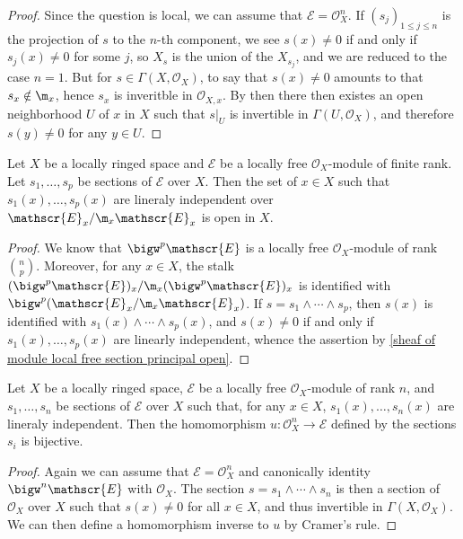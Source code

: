 \begin{proof}
Since the question is local, we can assume that $\mathscr{E}=\mathscr{O}_X^n$. If $(s_j)_{1\leq j\leq n}$ is the projection of $s$ to the $n$-th component, we see $s(x)\neq 0$ if and only if $s_j(x)\neq 0$ for some $j$, so $X_s$ is the union of the $X_{s_j}$, and we are reduced to the case $n=1$. But for $s\in\Gamma(X,\mathscr{O}_X)$, to say that $s(x)\neq 0$ amounts to that $s_x\notin\m_x$, hence $s_x$ is inveritble in $\mathscr{O}_{X,x}$. By then there then existes an open neighborhood $U$ of $x$ in $X$ such that $s|_U$ is invertible in $\Gamma(U,\mathscr{O}_X)$, and therefore $s(y)\neq 0$ for any $y\in U$.
\end{proof}
\begin{corollary}\label{sheaf of module local free section li open}
Let $X$ be a locally ringed space and $\mathscr{E}$ be a locally free $\mathscr{O}_X$-module of finite rank. Let $s_1,\dots,s_p$ be sections of $\mathscr{E}$ over $X$. Then the set of $x\in X$ such that $s_1(x),\dots,s_p(x)$ are lineraly independent over $\mathscr{E}_x/\m_x\mathscr{E}_x$ is open in $X$.
\end{corollary}
\begin{proof}
We know that $\bigw^p\mathscr{E}$ is a locally free $\mathscr{O}_X$-module of rank $\binom{n}{p}$. Moreover, for any $x\in X$, the stalk $(\bigw^p\mathscr{E})_x/\m_x(\bigw^p\mathscr{E})_x$ is identified with $\bigw^p(\mathscr{E}_x/\m_x\mathscr{E}_x)$. If $s=s_1\wedge\cdots\wedge s_p$, then $s(x)$ is identified with $s_1(x)\wedge\cdots\wedge s_p(x)$, and $s(x)\neq 0$ if and only if $s_1(x),\dots,s_p(x)$ are linearly independent, whence the assertion by \cref{sheaf of module local free section principal open}. 
\end{proof}
\begin{corollary}\label{sheaf of module local free section define iso if li}
Let $X$ be a locally ringed space, $\mathscr{E}$ be a locally free $\mathscr{O}_X$-module of rank $n$, and $s_1,\dots,s_n$ be sections of $\mathscr{E}$ over $X$ such that, for any $x\in X$, $s_1(x),\dots,s_n(x)$ are lineraly independent. Then the homomorphism $u:\mathscr{O}_X^n\to\mathscr{E}$ defined by the sections $s_i$ is bijective.
\end{corollary}
\begin{proof}
Again we can assume that $\mathscr{E}=\mathscr{O}_X^n$ and canonically identity $\bigw^n\mathscr{E}$ with $\mathscr{O}_X$. The section $s=s_1\wedge\cdots\wedge s_n$ is then a section of $\mathscr{O}_X$ over $X$ such that $s(x)\neq 0$ for all $x\in X$, and thus invertible in $\Gamma(X,\mathscr{O}_X)$. We can then define a homomorphism inverse to $u$ by Cramer's rule.
\end{proof}

